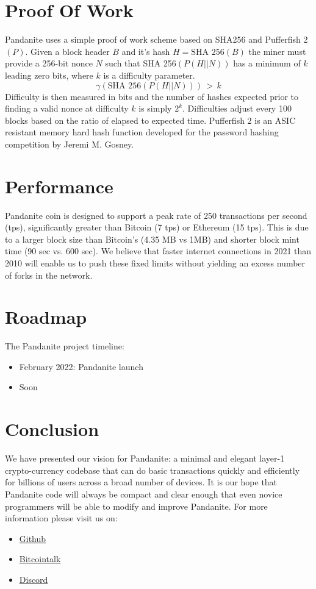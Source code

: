 \documentclass[11pt, a4paper]{elegantpaper}
\begin{document}
\section{ Proof Of Work}
Pandanite uses a simple proof of work scheme based on SHA256 and Pufferfish 2 $(P)$. Given a block
header $B$ and it’s hash $H = \text{SHA 256}(B)$ the miner must provide a 256-bit nonce $N$ such that
SHA 256$(P(H||N))$ has a minimum of $k$ leading zero bits, where $k$ is a difficulty parameter.
\begin{equation}
\gamma(\text{SHA 256}(P(H||N)))\,>\,k
\end{equation}
Difficulty is then measured in bits and the number of hashes expected prior to finding a valid nonce at difficulty $k$ is simply $2^k$. Difficulties adjust every 100 blocks based on the ratio of elapsed to expected time. Pufferfish 2 is an ASIC resistant memory hard hash function developed for the password hashing competition by Jeremi M. Gosney.
\section{Performance}
Pandanite coin is designed to support a peak rate of 250 transactions per second (tps), significantly
greater than Bitcoin (7 tps) or Ethereum (15 tps). This is due to a larger block size than Bitcoin’s
(4.35 MB vs 1MB) and shorter block mint time (90 sec vs. 600 sec). We believe that faster internet
connections in 2021 than 2010 will enable us to push these fixed limits without yielding an excess
number of forks in the network.
\section{ Roadmap}
The Pandanite project timeline:
\begin{itemize}
	\item February 2022: Pandanite launch
	\item Soon
\end{itemize}
\section{Conclusion}
We have presented our vision for Pandanite: a minimal and elegant layer-1 crypto-currency codebase
that can do basic transactions quickly and efficiently for billions of users across a broad number
of devices. It is our hope that Pandanite code will always be compact and clear enough that even
novice programmers will be able to modify and improve Pandanite. For more information please
visit us on:
\begin{itemize}
\item \href{https://github.com/pandanite-crypto}{Github}
\item \href{https://bitcointalk.org/index.php?topic=5428374.0}{Bitcointalk}
\item \href{https://discord.com/invite/crfkWjxYyT}{Discord}

\end{itemize}
\end{document}
